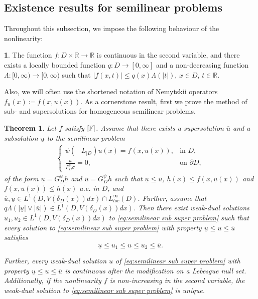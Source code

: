 \documentclass[12pt,a4paper,onecolumn]{article}
\makeatletter
\newtheorem{thm}{Theorem}[section]
\theoremstyle{definition}
\newtheorem*{assumption*}{\assumptionnumber}
\providecommand{\assumptionnumber}{}
\newenvironment{assumption}[2]
{%
	\renewcommand{\assumptionnumber}{(\textbf{#1#2})}%
	\begin{assumption*}%
		\protected@edef\@currentlabel{(\textbf{#1#2})}%
	}
	{%
	\end{assumption*}
}
\newcommand{\R}{\mathbb{R}}
\newcommand{\1}{\mathbf 1}
\newcommand{\de}{\delta_D}
\newcommand{\LLL}{L^1(D,V(\de(x))dx)}
\newcommand{\Lo}{\psi(-L_{|D})}
\newcommand{\GDP}{G_D^\psi}
\newcommand{\PDS}{P^{\psi}_{ D}}
\numberwithin{equation}{section}
\makeatother
\begin{document}
 \subsection{Existence results for semilinear problems}
  Throughout this subsection, we impose the following behaviour of the nonlinearity:
 	\begin{assumption}{F}{}\label{F}
		The function  $f:D\times \R\to\R$ is continuous in the second variable, and there exists a locally bounded function $q:D\to[0,\infty]$ and  a   non-decreasing function $\Lambda:[0,\infty)\to[0,\infty)$ such that $|f(x,t)|\le q(x)\Lambda(|t|)$, $x\in D$, $t\in \R$.
	\end{assumption}
Also, we will often use the shortened notation of Nemytskii operators $f_u(x)\coloneqq f(x,u(x))$. As a cornerstone result, first we prove the method of sub- and supersolutions for homogeneous semilinear problems. 
\begin{thm}\label{t:super-subsol} 
		Let $f$ satisfy $\ref{F}$. Assume that there exists a  supersolution $\overline u$ and a subsolution $\underline{u}$ to the semilinear problem
		\begin{align}\label{eq:semilinear sub super problem}
			\begin{cases}
				\Lo u(x)=f(x,u(x)),&\textrm{in $D$},\\
				\frac{u}{\PDS\sigma}=0,&\textrm{on $\partial D$},
			\end{cases}
		\end{align}
		of the form $\underline u=\GDP \underline h$ and $\overline u=\GDP \overline h$ such that $\underline u\le \overline u$, $\underline h(x)\le f(x,\underline u(x))$ and $f(x,\overline u(x))\le \overline h(x)$ a.e. in $D$, and $\overline{u},\underline{u}\in\LLL \cap L^\infty_{loc}(D)$. Further, assume that $q\Lambda(|\underline u|\vee |\overline u|)\in \LLL$. Then there exist weak-dual solutions $u_1,u_2\in\LLL$ to \eqref{eq:semilinear sub super problem} such that every solution to \eqref{eq:semilinear sub super problem} with property $\underline{u}\le u \le \overline u$  satisfies
		$$ \underline u\le u_1 \le u\le u_2\le \overline u.$$
		
		Further, every weak-dual solution $u$ of \eqref{eq:semilinear sub super problem} with property $\underline{u}\le u \le \overline u$ is continuous after the modification on a Lebesgue null set. Additionally, if the nonlinearity $f$ is non-increasing in the second variable, the weak-dual solution to \eqref{eq:semilinear sub super problem} is unique.
	\end{thm}
\end{document}
